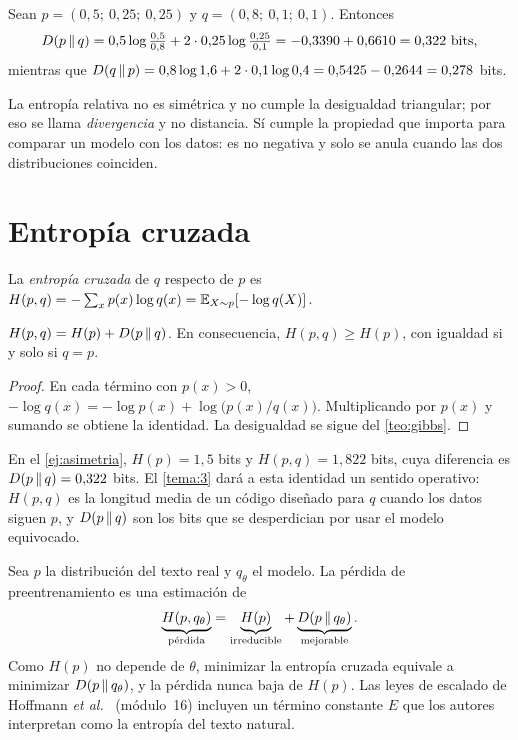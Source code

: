 \begin{ejemplo}[Asimetría]\label{ej:asimetria}
Sean $p=(0{,}5;\ 0{,}25;\ 0{,}25)$ y $q=(0{,}8;\ 0{,}1;\ 0{,}1)$. Entonces
\[
D(p\,\|\,q)=0{,}5\log\tfrac{0{,}5}{0{,}8}+2\cdot 0{,}25\log\tfrac{0{,}25}{0{,}1}=-0{,}3390+0{,}6610=0{,}322\text{ bits},
\]
mientras que $D(q\,\|\,p)=0{,}8\log 1{,}6+2\cdot 0{,}1\log 0{,}4=0{,}5425-0{,}2644=0{,}278$ bits.
\end{ejemplo}

\begin{observacion}
La entropía relativa no es simétrica y no cumple la desigualdad triangular; por eso se llama \emph{divergencia} y no distancia. Sí cumple la propiedad que importa para comparar un modelo con los datos: es no negativa y solo se anula cuando las dos distribuciones coinciden.
\end{observacion}

\section{Entropía cruzada}

\begin{definicion}\label{def:cruzada}
La \emph{entropía cruzada} de $q$ respecto de $p$ es $H(p,q)=-\sum_{x}p(x)\log q(x)=\mathbb{E}_{X\sim p}[-\log q(X)]$.
\end{definicion}

\begin{proposicion}\label{prop:descomposicion}
$H(p,q)=H(p)+D(p\,\|\,q)$. En consecuencia, $H(p,q)\ge H(p)$, con igualdad si y solo si $q=p$.
\end{proposicion}

\begin{proof}
En cada término con $p(x)>0$, $-\log q(x)=-\log p(x)+\log\bigl(p(x)/q(x)\bigr)$. Multiplicando por $p(x)$ y sumando se obtiene la identidad. La desigualdad se sigue del \cref{teo:gibbs}.
\end{proof}

En el \cref{ej:asimetria}, $H(p)=1{,}5$ bits y $H(p,q)=1{,}822$ bits, cuya diferencia es $D(p\,\|\,q)=0{,}322$ bits. El \cref{tema:3} dará a esta identidad un sentido operativo: $H(p,q)$ es la longitud media de un código diseñado para $q$ cuando los datos siguen $p$, y $D(p\,\|\,q)$ son los bits que se desperdician por usar el modelo equivocado.

\begin{observacion}
Sea $p$ la distribución del texto real y $q_\theta$ el modelo. La pérdida de preentrenamiento es una estimación de
\[
\underbrace{H(p,q_\theta)}_{\text{pérdida}}=\underbrace{H(p)}_{\text{irreducible}}+\underbrace{D(p\,\|\,q_\theta)}_{\text{mejorable}}.
\]
Como $H(p)$ no depende de $\theta$, minimizar la entropía cruzada equivale a minimizar $D(p\,\|\,q_\theta)$, y la pérdida nunca baja de $H(p)$. Las leyes de escalado de Hoffmann \emph{et al.}~\cite{chinchilla} (módulo~16) incluyen un término constante $E$ que los autores interpretan como la entropía del texto natural.
\end{observacion}

